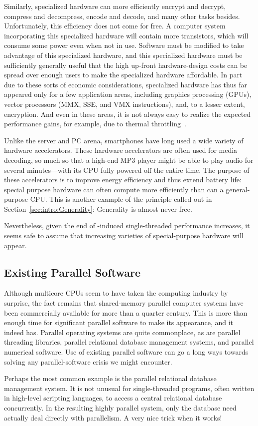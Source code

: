 Similarly, specialized hardware can more efficiently encrypt and decrypt,
compress and decompress, encode and decode, and many other tasks besides.
Unfortunately, this efficiency does not come for free.
A computer system incorporating this specialized hardware will contain
more transistors, which will consume some power even when not in use.
Software must be modified to take advantage of this specialized hardware,
and this specialized hardware must be sufficiently generally useful
that the high up-front hardware-design costs can be spread over enough
users to make the specialized hardware affordable.
In part due to these sorts of economic considerations, specialized
hardware has thus far appeared only for a few application areas,
including graphics processing (GPUs), vector processors (MMX, SSE,
and VMX instructions), and, to a lesser extent, encryption.
And even in these areas, it is not always easy to realize the expected
performance gains, for example, due to thermal
throttling~\cite{VladKrasnov2017SIMDfreqscale,DanielLemire2018SIMDfreqscale,TravisDowns2020SIMDfreqscale}.

Unlike the server and PC arena, smartphones have long used a wide
variety of hardware accelerators.
These hardware accelerators are often used for media decoding,
so much so that a high-end MP3 player might be able to play audio
for several minutes---with its CPU fully powered off the entire time.
The purpose of these accelerators is to improve energy efficiency
and thus extend battery life: special purpose hardware can often
compute more efficiently than can a general-purpose CPU\@.
This is another example of the principle called out in
Section~\ref{sec:intro:Generality}: Generality is almost never free.

Nevertheless, given the end of -induced
single-threaded performance increases, it seems safe to assume that
increasing varieties of special-purpose hardware will appear.

\subsection{Existing Parallel Software}
\label{sec:cpu:Existing Parallel Software}

Although multicore CPUs seem to have taken the computing industry
by surprise, the fact remains that shared-memory parallel computer
systems have been commercially available for more than a quarter
century.
This is more than enough time for significant parallel software
to make its appearance, and it indeed has.
Parallel operating systems are quite commonplace, as are parallel
threading libraries, parallel relational database management systems, 
and parallel numerical software.
Use of existing parallel software can go a long ways towards solving any
parallel-software crisis we might encounter.

Perhaps the most common example is the parallel relational database
management system.
It is not unusual for single-threaded programs, often written in
high-level scripting languages, to access a central relational
database concurrently.
In the resulting highly parallel system, only the database need actually
deal directly with parallelism.
A very nice trick when it works!
